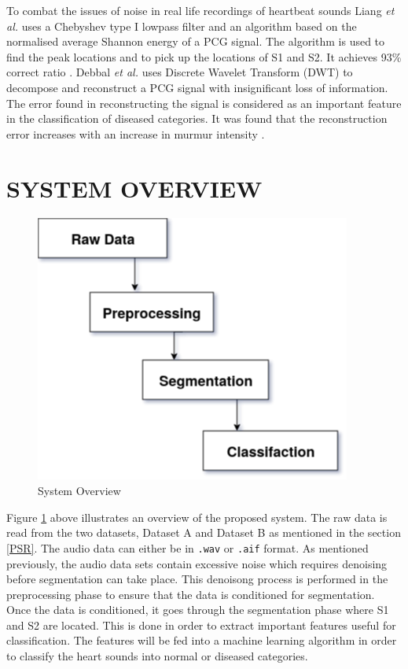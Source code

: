 \documentclass[10pt,twocolumn]{witseiepaper}
\begin{document}
To combat the issues of noise in real life recordings of heartbeat sounds Liang \textit{et al.} uses a Chebyshev type I lowpass filter and an algorithm  based on the normalised average Shannon energy of a PCG signal. The algorithm is used to find the peak locations and to pick up the locations of S1 and S2. It achieves 93\% correct ratio \cite{liang1997heart}. Debbal \textit{et al.} uses Discrete Wavelet Transform (DWT) to decompose and reconstruct a PCG signal with insignificant loss of information. The error found in reconstructing the signal is considered as an important feature in the classification of diseased categories. It was found that the reconstruction error increases with an increase in murmur intensity \cite{debbal}.



\section{SYSTEM OVERVIEW}

\begin{figure}[h!]
    \centering
    \includegraphics[scale = 0.52]{systemOverviw.png}
    \caption{System Overview}
    \label{fig:sysov}
\end{figure}{}


Figure \ref{fig:sysov} above illustrates an overview of the proposed system. The raw data is read from the two datasets, Dataset A and Dataset B as mentioned in the section \ref{PSR}. The audio data can either be in \texttt{.wav} or \texttt{.aif} format.
As mentioned previously, the audio data sets contain excessive noise which requires denoising before segmentation can take place. This denoisong process is performed in the preprocessing phase to ensure that the data is conditioned for segmentation. Once the data is conditioned, it goes through the segmentation phase where S1 and S2 are located. This is done in order to extract important features useful for classification. The features will be fed into a machine learning algorithm in order to classify the heart sounds into normal or diseased categories.
\end{document}

